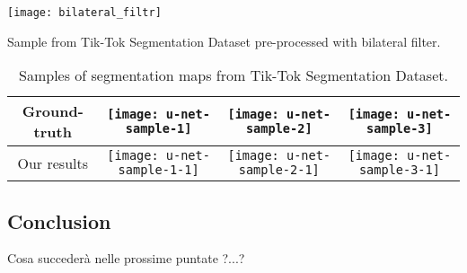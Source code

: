 \begin{table}[hbt!]
\centering
\texttt{[image: bilateral\_filtr]}
\caption{\label{bil_fil}Sample from Tik-Tok Segmentation Dataset pre-processed with bilateral filter.}
\end{table}


\begin{table}[hbt!]
\centering
\begin{tabular}{cccc}
Ground-truth & \texttt{[image: u-net-sample-1]} & \texttt{[image: u-net-sample-2]} & \texttt{[image: u-net-sample-3]} \\ [0.5ex] 
 \hline\hline
Our results & \texttt{[image: u-net-sample-1-1]} & \texttt{[image: u-net-sample-2-1]}   & \texttt{[image: u-net-sample-3-1]} \\
\end{tabular}
\caption{\label{tiktok_dataset}Samples of segmentation maps from Tik-Tok Segmentation Dataset.}
\end{table}

\FloatBarrier


\begin{multicols}{2}

\subsection{Conclusion}
Cosa succederà nelle prossime puntate ?...?


\end{multicols}